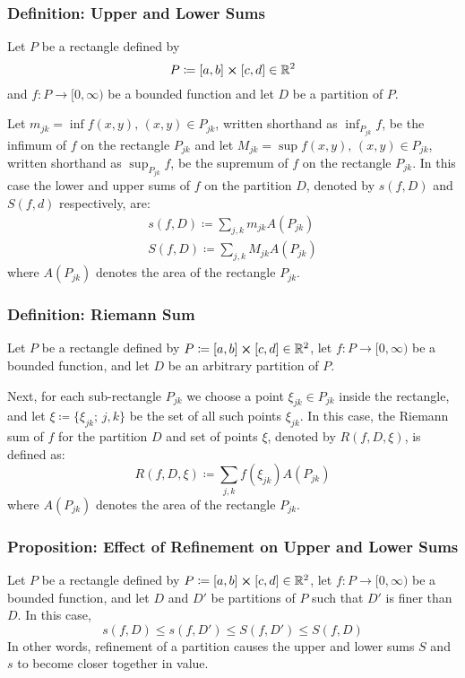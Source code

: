 \documentclass[11pt, a4paper]{article}
\begin{document}
\subsubsection{Definition: Upper and Lower Sums}
Let $ P $ be a rectangle defined by 
\begin{equation*}
	P \coloneqq [a, b] \cross [c, d] \in \mathbb{R}^2
\end{equation*}
and $ f : P \rightarrow [0, \infty)$ be a bounded function and let $ D $ be a partition of $ P $.

Let	$ m_{jk} = \inf f(x,y), \, (x, y) \in P_{jk} $, written shorthand as $ \inf_{P_{jk}}f $, be the infimum of $ f $ on the rectangle $ P_{jk} $ and let $ M_{jk} = \sup f(x,y), \, (x, y) \in P_{jk} $, written shorthand as $ \sup_{P_{jk}}f $, be the supremum of $ f $ on the rectangle $ P_{jk} $. In this case the lower and upper sums of $ f $ on the partition $ D $, denoted by $ s(f, D) $ and $ S(f, d) $ respectively, are:
\begin{align*}
	s(f, D) \coloneqq \sum_{j, k}^{} m_{jk} A\left(P_{jk}\right)\\
	S(f, D) \coloneqq \sum_{j, k}^{} M_{jk} A\left(P_{jk}\right)
\end{align*}
where $ A\left(P_{jk}\right) $ denotes the area of the rectangle $ P_{jk} $.

\subsubsection{Definition: Riemann Sum}
Let $ P $ be a rectangle defined by $P \coloneqq [a, b] \cross [c, d] \in \mathbb{R}^2 $, let $ f : P \rightarrow [0, \infty)$ be a bounded function, and let $ D $ be an arbitrary partition of $ P $. 

Next, for each sub-rectangle $ P_{jk} $ we choose a point $ \xi_{jk} \in  P_{jk}  $ inside the rectangle, and let $ \xi \coloneqq \{ \xi_{jk}; \, j, k\} $ be the set of all such points $ \xi_{jk} $. In this case, the Riemann sum of $ f $ for the partition $ D $ and set of points $ \xi $, denoted by $ R(f, D, \xi) $, is defined as:
\begin{equation*}
	R(f, D, \xi) \coloneqq \sum_{j, k}f(\xi_{jk})A\left(P_{jk}\right)
\end{equation*}
where $ A\left(P_{jk}\right) $ denotes the area of the rectangle $ P_{jk} $.

\subsubsection{Proposition: Effect of Refinement on Upper and Lower Sums}
Let $ P $ be a rectangle defined by $P \coloneqq [a, b] \cross [c, d] \in \mathbb{R}^2 $, let $ f : P \rightarrow [0, \infty)$ be a bounded function, and let $ D $ and $ D' $ be partitions of $ P $ such that $ D'$ is finer than $ D $. In this case,
\begin{equation*}
	s(f, D) \leq s(f, D') \leq S(f, D') \leq S(f, D)
\end{equation*}
In other words, refinement of a partition causes the upper and lower sums $ S $ and $ s $ to become closer together in value.
\end{document}
